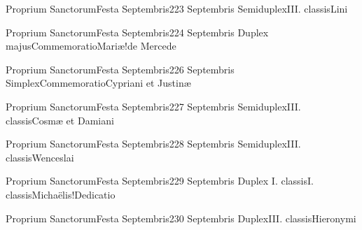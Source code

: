 \documentclass[liber-responsorialis_aestivus.tex]{subfiles}
\begin{document}
	{Proprium Sanctorum}{Festa Septembris}{2}{23 Septembris}
	{Semiduplex}{III. classis}{Lini}
	{\umexrubric}
	{\respdetemp}

	{Proprium Sanctorum}{Festa Septembris}{2}{24 Septembris}
	{Duplex majus}{Commemoratio}{Mariæ!de Mercede}
	{\cbmvrubric}
	{\respdetemp}

	{Proprium Sanctorum}{Festa Septembris}{2}{26 Septembris}
	{Simplex}{Commemoratio}{Cypriani et Justinæ}
	{}
	{}
\rubric{\respdetemp}

	{Proprium Sanctorum}{Festa Septembris}{2}{27 Septembris}
	{Semiduplex}{III. classis}{Cosmæ et Damiani}
	{\pmexrubric}
	{\respdetemp}

	{Proprium Sanctorum}{Festa Septembris}{2}{28 Septembris}
	{Semiduplex}{III. classis}{Wenceslai}
	{\umexrubric}
	{\respdetemp}

	{Proprium Sanctorum}{Festa Septembris}{2}{29 Septembris}
	{Duplex I. classis}{I. classis}{Michaëlis!Dedicatio}
	{}
	{}

	{Proprium Sanctorum}{Festa Septembris}{2}{30 Septembris}
	{Duplex}{III. classis}{Hieronymi}
	{\conpdorubric}
	{\respdetemp}
\end{document}
